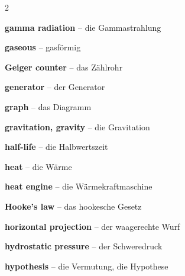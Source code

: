 \begin{multicols}{2}
\par\nopagebreak
\textbf{gamma radiation} -- die Gammastrahlung\dotfill\hyperref[e:277]{\pageref*{e:277}}\par
\textbf{gaseous} -- gasförmig\dotfill\hyperref[e:128]{\pageref*{e:128}}\par
\textbf{Geiger counter} -- das Zählrohr\dotfill\hyperref[e:279]{\pageref*{e:279}}\par
\textbf{generator} -- der Generator\dotfill\hyperref[e:187]{\pageref*{e:187}}\par
\textbf{graph} -- das Diagramm\dotfill\hyperref[e:23]{\pageref*{e:23}}\par
\textbf{gravitation, gravity} -- die Gravitation\dotfill\hyperref[e:93]{\pageref*{e:93}}\par

\par\nopagebreak
\textbf{half-life} -- die Halbwertszeit\dotfill\hyperref[e:280]{\pageref*{e:280}}\par
\textbf{heat} -- die Wärme\dotfill\hyperref[e:117]{\pageref*{e:117}}\par
\textbf{heat engine} -- die Wärmekraftmaschine\dotfill\hyperref[e:141]{\pageref*{e:141}}\par
\textbf{Hooke's law} -- das hookesche Gesetz\dotfill\hyperref[e:73]{\pageref*{e:73}}\par
\textbf{horizontal projection} -- der waagerechte Wurf\dotfill\hyperref[e:48]{\pageref*{e:48}}\par
\textbf{hydrostatic pressure} -- der Schweredruck\dotfill\hyperref[e:90]{\pageref*{e:90}}\par
\textbf{hypothesis} -- die Vermutung, die Hypothese\dotfill\hyperref[e:20]{\pageref*{e:20}}\par


\end{multicols}
